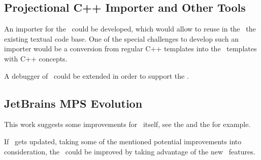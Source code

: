 \subsection{Projectional C++ Importer and Other Tools}
An importer for the \pcpp\ could be developed, which would allow to reuse in the \pcpp\ the
existing textual code base. One of the special challenges to develop such an importer would 
be a conversion from regular C++ templates into the \pcpp\ templates with C++ concepts.

A debugger of \mbdr\ could be extended in order to support the \pcpp.


\subsection{JetBrains MPS Evolution}

This work suggests some improvements for \jbmps\ itself, see the  and the 
 for example.

If \jbmps\ gets updated, taking some of the mentioned potential improvements into consideration,
the \pcpp\ could be improved by taking advantage of the new \jbmps\ features.